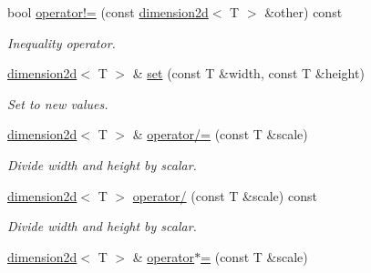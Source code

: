 \begin{DoxyCompactItemize}
\mbox{\label{classirr_1_1core_1_1dimension2d_a7bc8e7a51170f1e0758476d5fac4ff1b}} 
bool \hyperlink{classirr_1_1core_1_1dimension2d_a7bc8e7a51170f1e0758476d5fac4ff1b}{operator!=} (const \hyperlink{classirr_1_1core_1_1dimension2d}{dimension2d}$<$ T $>$ \&other) const
\begin{DoxyCompactList}\small\item\em Inequality operator. \end{DoxyCompactList}\item 
\mbox{\label{classirr_1_1core_1_1dimension2d_a81860d7ff5a888a37af84f7bbbad7c91}} 
\hyperlink{classirr_1_1core_1_1dimension2d}{dimension2d}$<$ T $>$ \& \hyperlink{classirr_1_1core_1_1dimension2d_a81860d7ff5a888a37af84f7bbbad7c91}{set} (const T \&width, const T \&height)
\begin{DoxyCompactList}\small\item\em Set to new values. \end{DoxyCompactList}\item 
\mbox{\label{classirr_1_1core_1_1dimension2d_ac581fbe07dabf2a342314c7a73f862c8}} 
\hyperlink{classirr_1_1core_1_1dimension2d}{dimension2d}$<$ T $>$ \& \hyperlink{classirr_1_1core_1_1dimension2d_ac581fbe07dabf2a342314c7a73f862c8}{operator/=} (const T \&scale)
\begin{DoxyCompactList}\small\item\em Divide width and height by scalar. \end{DoxyCompactList}\item 
\mbox{\label{classirr_1_1core_1_1dimension2d_a927291115ac1098aeb5f98de6ce306ea}} 
\hyperlink{classirr_1_1core_1_1dimension2d}{dimension2d}$<$ T $>$ \hyperlink{classirr_1_1core_1_1dimension2d_a927291115ac1098aeb5f98de6ce306ea}{operator/} (const T \&scale) const
\begin{DoxyCompactList}\small\item\em Divide width and height by scalar. \end{DoxyCompactList}\item 
\mbox{\label{classirr_1_1core_1_1dimension2d_acd311b8270b3c95791edf9a5b2869b1b}} 
\hyperlink{classirr_1_1core_1_1dimension2d}{dimension2d}$<$ T $>$ \& \hyperlink{classirr_1_1core_1_1dimension2d_acd311b8270b3c95791edf9a5b2869b1b}{operator$\ast$=} (const T \&scale)

\end{DoxyCompactItemize}
